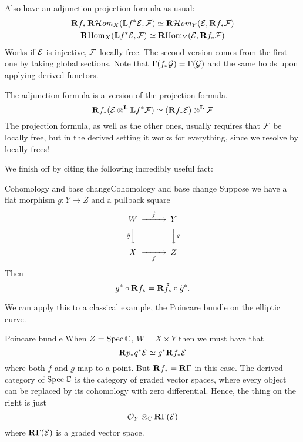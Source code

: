 Also have an adjunction projection formula as usual:
\begin{gather*}
    \mathbf{R} f_*\operatorname{\mathbf{R}\mathcal{H}\mathit{om}}_X(\mathbf{L} f^*\mathcal{E},\mathcal{F})
        \simeq \operatorname{\mathbf{R}\mathcal{H}\mathit{om}}_Y(\mathcal{E},\mathbf{R} f_*\mathcal{F}) \\
    \operatorname{\mathbf{R} Hom}_X(\mathbf{L} f^*\mathcal{E},\mathcal{F})
        \simeq \operatorname{\mathbf{R} Hom}_Y(\mathcal{E},\mathbf{R} f_*\mathcal{F})
\end{gather*}
Works if $\mathcal{E}$ is injective, $\mathcal{F}$ locally free. The second version comes from the first one by taking global sections. Note that $\Gamma(f_*\mathcal{G})=\Gamma(\mathcal{G})$ and the same holds upon applying derived functors.

The adjunction formula is a version of the projection formula.
\begin{equation*}
    \mathbf{R} f_*(\mathcal{E}\otimes^{\mathbf{L}}\mathbf{L} f^*\mathcal{F})
        \simeq (\mathbf{R} f_*\mathcal{E})\otimes^{\mathbf{L}}\mathcal{F}
\end{equation*}
The projection formula, as well as the other ones, usually requires that $\mathcal{F}$ be locally free, but in the derived setting it works for everything, since we resolve by locally frees!

We finish off by citing the following incredibly useful fact:

\begin{theorem}{Cohomology and base change}{Cohomology and base change}
    Suppose we have a flat morphism $g:Y\to Z$ and a pullback square
    \begin{equation*}
        \begin{CD}
            W @>\tilde f>> Y \\
              @V\tilde gVV @VVgV \\
            X @>>f> Z
        \end{CD}
    \end{equation*}
    Then
    \begin{equation*}
        g^*\circ\mathbf{R} f_*=\mathbf{R}\tilde f_*\circ\tilde g^*.
    \end{equation*}
\end{theorem}

We can apply this to a classical example, the Poincare bundle on the elliptic curve.
\begin{example}{Poincare bundle}{}
When $Z=\operatorname{Spec}\mathbb{C}$, $W=X\times Y$ then we must have that
\begin{equation*}
    \mathbf{R} p_*q^*\mathcal{E} \simeq g^*\mathbf{R} f_*\mathcal{E}
\end{equation*}
where both $f$ and $g$ map to a point. But $\mathbf{R} f_*=\operatorname{\mathbf{R}\Gamma}$ in this case. The derived category of $\operatorname{Spec}\mathbb{C}$ is the category of graded vector spaces, where every object can be replaced by its cohomology with zero differential. Hence, the thing on the right is just
\begin{equation*}
    \mathcal{O}_Y\otimes_{\mathbb{C}}\operatorname{\mathbf{R}\Gamma}(\mathcal{E})
\end{equation*}
where $\operatorname{\mathbf{R}\Gamma}(\mathcal{E})$ is a graded vector space.

\end{example}

